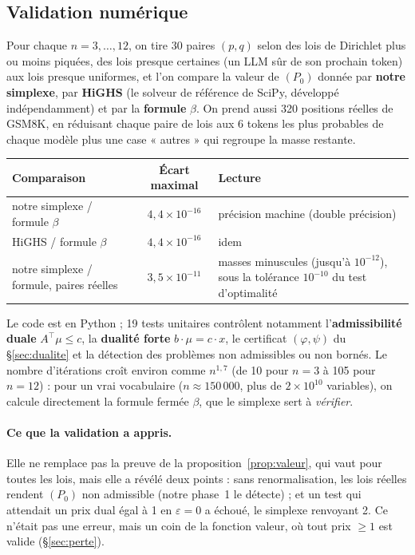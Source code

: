 \documentclass[11pt,a4paper]{article}
\theoremstyle{plain}
\theoremstyle{definition}
\begin{document}
\subsection{Validation numérique}\label{sec:validation}
Pour chaque $n=3,\dots,12$, on tire 30 paires $(p,q)$ selon des lois de Dirichlet plus ou moins piquées, des lois presque certaines (un LLM sûr de son prochain token) aux lois presque uniformes, et l'on compare la valeur de $(P_0)$ donnée par \textbf{notre simplexe}, par \textbf{HiGHS} (le solveur de référence de SciPy, développé indépendamment) et par la \textbf{formule} $\beta$. On prend aussi 320 positions réelles de GSM8K, en réduisant chaque paire de lois aux 6 tokens les plus probables de chaque modèle plus une case « autres » qui regroupe la masse restante.
\begin{center}
\small
\begin{tabularx}{\linewidth}{@{}lcX@{}}
\toprule
Comparaison & Écart maximal & Lecture\\\midrule
notre simplexe / formule $\beta$ & $4{,}4\times10^{-16}$ & précision machine (double précision)\\
HiGHS / formule $\beta$ & $4{,}4\times10^{-16}$ & idem\\
notre simplexe / formule, paires réelles & $3{,}5\times10^{-11}$ & masses minuscules (jusqu'à $10^{-12}$), sous la tolérance $10^{-10}$ du test d'optimalité\\
\bottomrule
\end{tabularx}
\end{center}
Le code est en Python ; 19 tests unitaires contrôlent notamment l'\textbf{admissibilité duale} $A^\top\mu\le c$, la \textbf{dualité forte} $b\cdot\mu=c\cdot x$, le certificat $(\varphi,\psi)$ du §\ref{sec:dualite} et la détection des problèmes non admissibles ou non bornés. Le nombre d'itérations croît environ comme $n^{1{,}7}$ (de 10 pour $n=3$ à 105 pour $n=12$) : pour un vrai vocabulaire ($n\approx150\,000$, plus de $2\times10^{10}$ variables), on calcule directement la formule fermée $\beta$, que le simplexe sert à \emph{vérifier}.

\paragraph{Ce que la validation a appris.} Elle ne remplace pas la preuve de la proposition~\ref{prop:valeur}, qui vaut pour toutes les lois, mais elle a révélé deux points : sans renormalisation, les lois réelles rendent $(P_0)$ non admissible (notre phase~1 le détecte) ; et un test qui attendait un prix dual égal à 1 en $\varepsilon=0$ a échoué, le simplexe renvoyant 2. Ce n'était pas une erreur, mais un coin de la fonction valeur, où tout prix $\ge1$ est valide (§\ref{sec:perte}).
\end{document}
